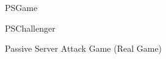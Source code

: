 \begin{figure}[!h]
  \centering
  \begin{center}
    \begin{bbrenv}{PSGame}
      \begin{bbrbox}[name=Adversary, minheight=2cm]
        
      \end{bbrbox}
      \begin{bbrchallenger}{PSChallenger}
        \begin{bbrbox}[name=Challenger]
        \end{bbrbox}
      \end{bbrchallenger}
    \end{bbrenv}
  \end{center}
  \caption{Passive Server Attack Game (Real Game)}
  \label{fig:passiveServerGame}
\end{figure}

